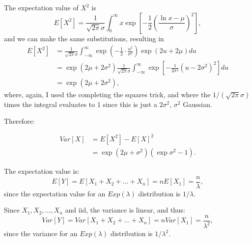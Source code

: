\begin{problem}{22}
\begin{enumerate}
 The expectation value of $X^2$ is
\begin{equation*}
E[X^2] = \frac{1}{\sqrt{2 \pi} \sigma}\int_0^\infty x \exp{\left[-\frac{1}{2} \left(\frac{\ln{x}-\mu}{\sigma} \right)^2\right]},
 \end{equation*}
 and we can make the same substitutions, resulting in 
  \begin{align*}
E[X^2] &= \frac{1}{\sqrt{2 \pi} \sigma}\int_{-\infty}^\infty \exp{\left(-\frac{1}{2} \cdot \frac{u^2}{\sigma^2}\right)} \exp{(2u+2 \mu)}du \\
& =  \exp{\left(2 \mu+2\sigma^2 \right)} \frac{1}{\sqrt{2 \pi} \sigma}\int_{-\infty}^\infty \exp{\left[-\frac{1}{2 \sigma^2} (u-2\sigma^2)^2 \right]}du \\
& =\exp{\left(2\mu+2\sigma^2 \right)},
 \end{align*}
 where, again, I used the completing the squares trick, and where the $1/(\sqrt{2 \pi} \sigma)$ times the integral evaluates to 1 since this is just a  $2\sigma^2$, $\sigma^2$  Gaussian.  
 
 Therefore:
 
 	\begin{align*}
	Var[X] &= E[X^2]-E[X]^2 \\
	& =  \exp{(2 \mu +\sigma^2)}\left(\exp{\sigma^2}-1 \right).
	\end{align*}
 

	\end{enumerate}
\end{problem}



\begin{problem}{23}
The expectation value is:
\begin{equation*}
E[Y] = E[X_1+X_2+\ldots+X_n]=nE[X_1] = \frac{n}{\lambda},
\end{equation*}
since the expectation value for an $Exp(\lambda)$ distribution is $1/\lambda$.

Since $X_1, X_2, \ldots ,X_n$ and iid, the variance is linear, and thus:
\begin{equation*}
Var[Y] = Var[X_1+X_2+\ldots+X_n]=nVar[X_1] = \frac{n}{\lambda^2},
\end{equation*}
since the variance for an $Exp(\lambda)$ distribution is $1/\lambda^2$.
\end{problem}


